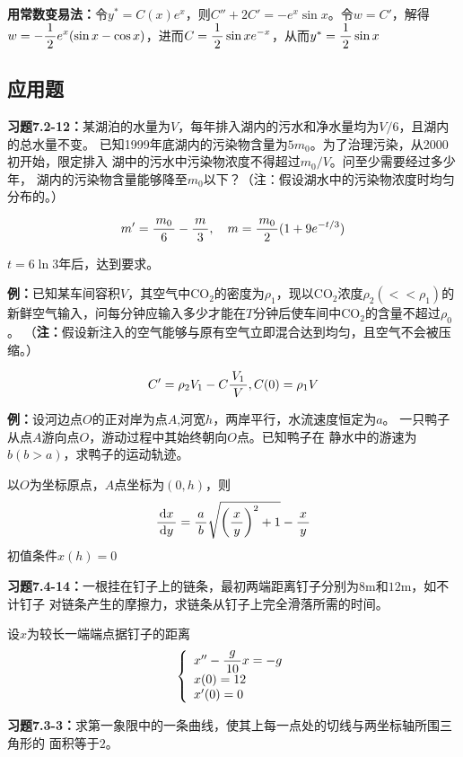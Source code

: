 \begin{shaded}
{\bf 用常数变易法：}令$y^*=C(x)e^x$，则$C''+2C'=-e^x\sin x$。令$w=C'$，解得
$w=-\displaystyle\frac{\,{1}\,}{\,{2}\,}e^x(\sin x-\cos x)$，进而$C=\displaystyle\frac{\,{1}\,}{\,{2}\,}\sin xe^{-x}$，从而$y^*=\displaystyle\frac{\,{1}\,}{\,{2}\,}\sin x$
\end{shaded}
		
\subsection{应用题}

{\bf 习题7.2-12：}某湖泊的水量为$V$，每年排入湖内的污水和净水量均为$V/6$，且湖内的总水量不变。
已知1999年底湖内的污染物含量为$5m_0$。为了治理污染，从2000初开始，限定排入
湖中的污水中污染物浓度不得超过$m_0/V$。问至少需要经过多少年，
湖内的污染物含量能够降至$m_0$以下？（注：假设湖水中的污染物浓度时均匀分布的。）

$$m'=\displaystyle\frac{\,{m_0}\,}{\,{6}\,}-\displaystyle\frac{\,{m}\,}{\,{3}\,},\quad m=\displaystyle\frac{\,{m_0}\,}{\,{2}\,}(1+9e^{-t/3})$$

$t=6\ln3$年后，达到要求。

{\bf 例：}已知某车间容积$V$，其空气中CO$_2$的密度为$\rho_1$，现以CO$_2$浓度$\rho_2(<<\rho_1)$的
新鲜空气输入，问每分钟应输入多少才能在$T$分钟后使车间中CO$_2$的含量不超过$\rho_0$。
（{\bf 注：}假设新注入的空气能够与原有空气立即混合达到均匀，且空气不会被压缩。）

$$C'=\rho_2V_1-C\displaystyle\frac{\,{V_1}\,}{\,{V}\,},C(0)=\rho_1V$$


{\bf 例：}设河边点$O$的正对岸为点$A$,河宽$h$，两岸平行，水流速度恒定为$a$。
一只鸭子从点$A$游向点$O$，游动过程中其始终朝向$O$点。已知鸭子在
静水中的游速为$b(b>a)$，求鸭子的运动轨迹。

以$O$为坐标原点，$A$点坐标为$(0,h)$，则
$$\displaystyle\frac{\,{\mathrm{d} x}\,}{\,{\mathrm{d} y}\,}=\displaystyle\frac{\,{a}\,}{\,{b}\,}\sqrt{\left(\displaystyle\frac{\,{x}\,}{\,{y}\,}\right)^2+1}-\displaystyle\frac{\,{x}\,}{\,{y}\,}$$
初值条件$x(h)=0$

{\bf 习题7.4-14：}一根挂在钉子上的链条，最初两端距离钉子分别为$8$m和$12$m，如不计钉子
对链条产生的摩擦力，求链条从钉子上完全滑落所需的时间。

设$x$为较长一端端点据钉子的距离
$$\left\{\begin{array}{l}
	x''-\displaystyle\frac{\,{g}\,}{\,{10}\,}x=-g\\
	x(0)=12\\
	x'(0)=0
\end{array}\right.$$

{\bf 习题7.3-3：}求第一象限中的一条曲线，使其上每一点处的切线与两坐标轴所围三角形的
面积等于$2$。

